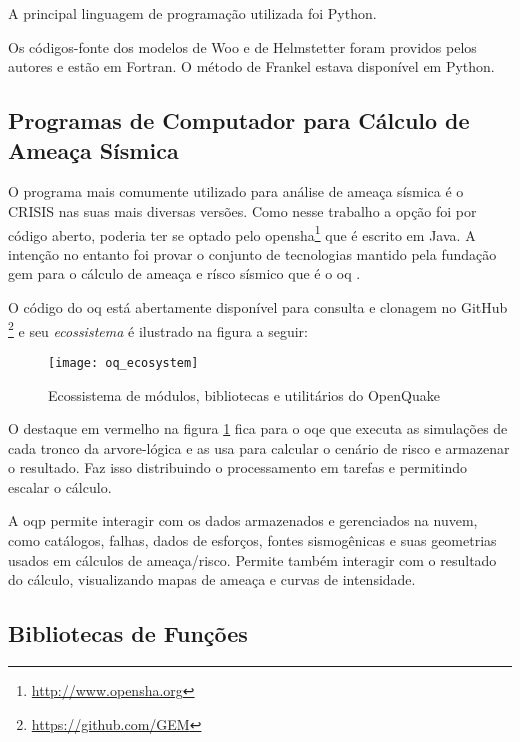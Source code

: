 A principal linguagem de programação utilizada foi Python.

Os códigos-fonte dos modelos de Woo e de Helmstetter foram providos pelos autores
e estão em Fortran. O método de Frankel estava disponível em Python.


\subsection{Programas de Computador para Cálculo de Ameaça Sísmica}
\label{sec:software}

O programa mais comumente utilizado para análise de ameaça sísmica é o CRISIS \citep{crisis_2007} nas suas
mais diversas versões. Como nesse trabalho a opção foi por código aberto, poderia ter se optado pelo 
\gls{opensha}\footnote{\url{http://www.opensha.org}} que é escrito em Java.
A intenção no entanto foi provar o conjunto de tecnologias mantido pela fundação \gls{gem}
para o cálculo de ameaça e rísco sísmico que é o \gls{oq} \citep{pagani_2014}.

O código do \gls{oq} está abertamente disponível para consulta e clonagem no GitHub
\footnote{\url{https://github.com/GEM}} e seu \emph{ecossistema} é ilustrado na figura a seguir:

\begin{figure}[!h]
  \centering
  \texttt{[image: oq\_ecosystem]} 
  \caption{Ecossistema de módulos, bibliotecas e utilitários do OpenQuake}
  \label{fig:oq} 
\end{figure}

O destaque em vermelho na figura \ref{fig:oq} fica para o \gls{oqe} que executa as simulações de cada tronco da
arvore-lógica e as usa para calcular o cenário de risco e armazenar o resultado.
Faz isso distribuindo o processamento em tarefas e permitindo escalar o cálculo.

A \gls{oqp} permite interagir com os dados armazenados e gerenciados na nuvem, como catálogos, 
falhas, dados de esforços, fontes sismogênicas e suas geometrias usados em cálculos de ameaça/risco.
Permite também interagir com o resultado do cálculo, visualizando mapas de ameaça e curvas de intensidade.

\subsection{Bibliotecas de Funções}
\label{sec:bibliotecas}

